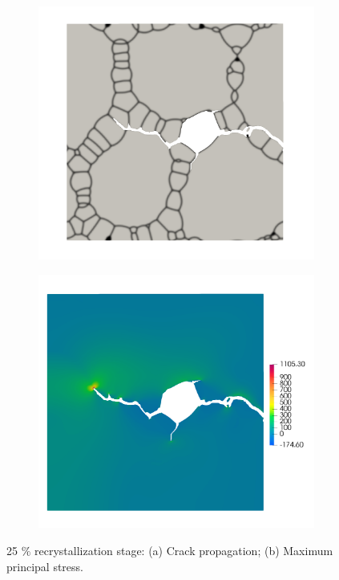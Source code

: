\begin{figure}[htb!]
  \centering
  \begin{subfigure}[t]{0.49\linewidth}
    \centering
    \includegraphics[width=\linewidth]{Chapter3/figures/partial_hbs_1}
    \caption{}
  \end{subfigure}
  \begin{subfigure}[t]{0.49\linewidth}
    \centering
    \includegraphics[width=\linewidth]{Chapter3/figures/partial_hbs_1_stress}
    \caption{}
  \end{subfigure}
  \caption{\label{fig:partial_hbs_1}  25 $\%$ recrystallization stage: (a) Crack propagation; (b) Maximum principal stress.}
\end{figure}

